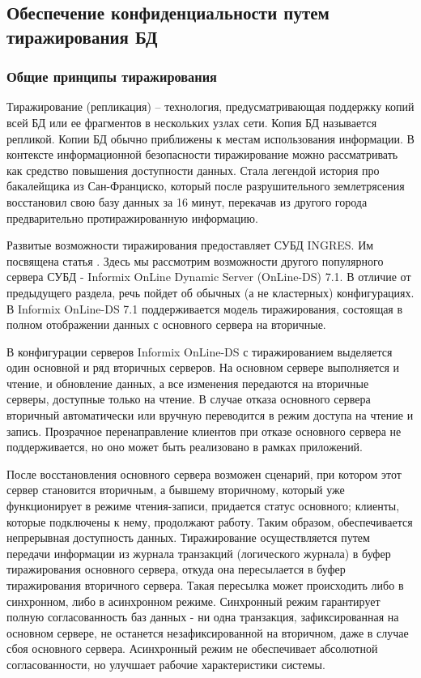\subsection{Обеспечение конфиденциальности путем тиражирования БД}

\subsubsection{Общие принципы тиражирования}

Тиражирование (репликация) – технология, предусматривающая поддержку
копий всей БД или ее фрагментов в нескольких узлах сети. Копия БД называется
репликой. Копии БД обычно приближены к местам использования информации.
В контексте информационной безопасности тиражирование можно рассматривать как средство повышения
доступности данных. Стала легендой история про бакалейщика из Сан-Франциско, который после
разрушительного землетрясения восстановил свою базу данных за 16 минут, перекачав из другого
города предварительно протиражированную информацию.

Развитые возможности тиражирования предоставляет СУБД INGRES.
Им посвящена статья \cite{BeynonDavies}. Здесь мы рассмотрим возможности другого популярного сервера
СУБД - Informix OnLine Dynamic Server (OnLine-DS) 7.1. В отличие от предыдущего раздела, речь
пойдет об обычных (а не кластерных) конфигурациях.
В Informix OnLine-DS 7.1 поддерживается модель тиражирования, состоящая в полном отображении данных
с основного сервера на вторичные.

В конфигурации серверов Informix OnLine-DS с тиражированием выделяется один основной и ряд
вторичных серверов. На основном сервере выполняется и чтение, и обновление данных, а все изменения
передаются на вторичные серверы, доступные только на чтение. В случае отказа основного сервера
вторичный автоматически или вручную переводится в режим доступа на чтение и запись. Прозрачное
перенаправление клиентов при отказе основного сервера не поддерживается, но оно может быть
реализовано в рамках приложений.

После восстановления основного сервера возможен сценарий, при котором этот сервер становится
вторичным, а бывшему вторичному, который уже функционирует в режиме чтения-записи, придается
статус основного; клиенты, которые подключены к нему, продолжают работу. Таким образом,
обеспечивается непрерывная доступность данных.
Тиражирование осуществляется путем передачи информации из журнала транзакций (логического журнала)
в буфер тиражирования основного сервера, откуда она пересылается в буфер тиражирования вторичного
сервера. Такая пересылка может происходить либо в синхронном, либо в асинхронном режиме. Синхронный
режим гарантирует полную согласованность баз данных - ни одна транзакция, зафиксированная на
основном сервере, не останется незафиксированной на вторичном, даже в случае сбоя основного
сервера. Асинхронный режим не обеспечивает абсолютной согласованности, но улучшает рабочие
характеристики системы.

